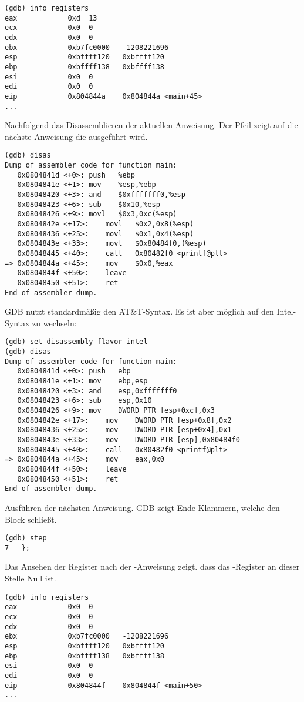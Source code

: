\begin{lstlisting}
(gdb) info registers
eax            0xd	13
ecx            0x0	0
edx            0x0	0
ebx            0xb7fc0000	-1208221696
esp            0xbffff120	0xbffff120
ebp            0xbffff138	0xbffff138
esi            0x0	0
edi            0x0	0
eip            0x804844a	0x804844a <main+45>
...
\end{lstlisting}

Nachfolgend das Disassemblieren der aktuellen Anweisung.
Der Pfeil zeigt auf die nächste Anweisung die ausgeführt wird.

\begin{lstlisting}[style=customasmx86]
(gdb) disas
Dump of assembler code for function main:
   0x0804841d <+0>:	push   %ebp
   0x0804841e <+1>:	mov    %esp,%ebp
   0x08048420 <+3>:	and    $0xfffffff0,%esp
   0x08048423 <+6>:	sub    $0x10,%esp
   0x08048426 <+9>:	movl   $0x3,0xc(%esp)
   0x0804842e <+17>:	movl   $0x2,0x8(%esp)
   0x08048436 <+25>:	movl   $0x1,0x4(%esp)
   0x0804843e <+33>:	movl   $0x80484f0,(%esp)
   0x08048445 <+40>:	call   0x80482f0 <printf@plt>
=> 0x0804844a <+45>:	mov    $0x0,%eax
   0x0804844f <+50>:	leave  
   0x08048450 <+51>:	ret    
End of assembler dump.
\end{lstlisting}

\ac{GDB} nutzt standardmäßig den AT\&T-Syntax.
Es ist aber möglich auf den Intel-Syntax zu wechseln:

\begin{lstlisting}[style=customasmx86]
(gdb) set disassembly-flavor intel
(gdb) disas
Dump of assembler code for function main:
   0x0804841d <+0>:	push   ebp
   0x0804841e <+1>:	mov    ebp,esp
   0x08048420 <+3>:	and    esp,0xfffffff0
   0x08048423 <+6>:	sub    esp,0x10
   0x08048426 <+9>:	mov    DWORD PTR [esp+0xc],0x3
   0x0804842e <+17>:	mov    DWORD PTR [esp+0x8],0x2
   0x08048436 <+25>:	mov    DWORD PTR [esp+0x4],0x1
   0x0804843e <+33>:	mov    DWORD PTR [esp],0x80484f0
   0x08048445 <+40>:	call   0x80482f0 <printf@plt>
=> 0x0804844a <+45>:	mov    eax,0x0
   0x0804844f <+50>:	leave  
   0x08048450 <+51>:	ret    
End of assembler dump.
\end{lstlisting}

Ausführen der nächsten Anweisung.
\ac{GDB} zeigt Ende-Klammern, welche den Block schließt.

\begin{lstlisting}
(gdb) step
7	};
\end{lstlisting}

Das Ansehen der Register nach der -Anweisung zeigt. dass
das \EAX-Register an dieser Stelle Null ist.

\begin{lstlisting}
(gdb) info registers
eax            0x0	0
ecx            0x0	0
edx            0x0	0
ebx            0xb7fc0000	-1208221696
esp            0xbffff120	0xbffff120
ebp            0xbffff138	0xbffff138
esi            0x0	0
edi            0x0	0
eip            0x804844f	0x804844f <main+50>
...
\end{lstlisting}

